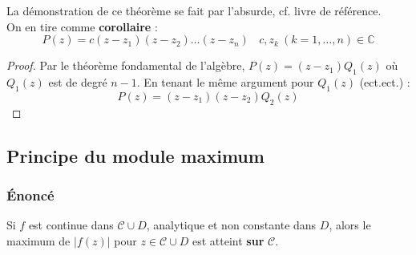 La démonstration de ce théorème se fait par l'absurde, cf. livre de référence. \\
On en tire comme \textbf{corollaire} :
\begin{equation}
	P(z) = c(z-z_1)(z-z_2)\dots(z-z_n)\ \ \ \ c,z_k\ (k=1,\dots,n) \in \mathbb{C}
\end{equation}
\begin{proof}
	Par le théorème fondamental de l'algèbre, $P(z) = (z-z_1)Q_1(z)$ où $Q_1(z)$ est de degré $n-1$.
	En tenant le même argument pour $Q_1(z)$ (ect.ect.) :
	\begin{equation}
		P(z) = (z-z_1)(z-z_2)Q_2(z)
	\end{equation}
\end{proof}
	
\subsection{Principe du module maximum}
\subsubsection{Énoncé}
Si $f$ est continue dans $\mathcal{C} \cup D$, analytique et non constante dans $D$, alors le 
maximum de $|f(z)|$ pour $z \in \mathcal{C} \cup D$ est atteint \textbf{sur} $\mathcal{C}$.\\
		
	